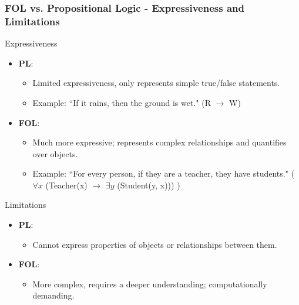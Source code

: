 \documentclass[aspectratio=169]{beamer}
\begin{document}
\begin{frame}[fragile]
  \frametitle{FOL vs. Propositional Logic - Expressiveness and Limitations}
  \begin{block}{Expressiveness}
    \begin{itemize}
      \item \textbf{PL}:
        \begin{itemize}
          \item Limited expressiveness, only represents simple true/false statements.
          \item Example: ``If it rains, then the ground is wet." (R $\rightarrow$ W)
        \end{itemize}
      \item \textbf{FOL}:
        \begin{itemize}
          \item Much more expressive; represents complex relationships and quantifies over objects.
          \item Example: ``For every person, if they are a teacher, they have students." 
          ( $\forall x$ (Teacher(x) $\rightarrow$ $\exists y$ (Student(y, x))) )
        \end{itemize}
    \end{itemize}
  \end{block}
  
  \begin{block}{Limitations}
    \begin{itemize}
      \item \textbf{PL}:
        \begin{itemize}
          \item Cannot express properties of objects or relationships between them.
        \end{itemize}
      \item \textbf{FOL}:
        \begin{itemize}
          \item More complex, requires a deeper understanding; computationally demanding.
        \end{itemize}
    \end{itemize}
  \end{block}
\end{frame}
\end{document}
